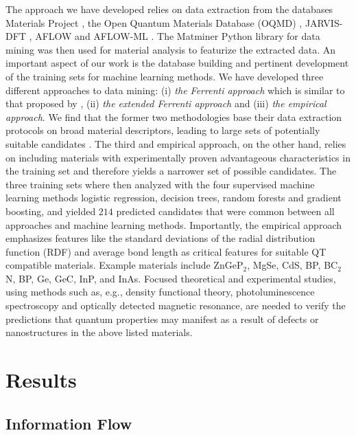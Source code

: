 \documentclass[superscriptaddress,unsortedaddress,
 amsmath,amssymb,
 aps,
]{revtex4-2}
\begin{document}
The approach we have developed relies on data extraction from the databases Materials Project \cite{Jain2013,Jain2018}, the Open Quantum Materials Database (OQMD) \cite{Saal2013, Kirklin2015}, JARVIS-DFT \cite{Choudhary2020}, AFLOW \cite{Curtarolo2012, Curtarolo2012a, Calderon2015} and AFLOW-ML \cite{Isayev2017}. 
The Matminer Python library for data mining \cite{Ward2018} was then used for material analysis to featurize the extracted data. An important aspect of our work is the database building and pertinent development of the training sets for machine learning methods. We have developed three different approaches to data mining: (i) \emph{the Ferrenti approach} which is similar to that proposed by \citeauthor{Ferrenti2020} \cite{Ferrenti2020}, (ii) 
\emph{the extended Ferrenti approach} and (iii) \emph{the empirical approach}. We find that the former two methodologies base their data extraction protocols on broad material descriptors, leading to large sets of potentially suitable candidates \cite{Mehta2019,Hastie2009}. The third and empirical approach, on the other hand, relies on including materials with experimentally proven advantageous characteristics in the training set and therefore yields a narrower set of possible candidates.  The three training sets where then analyzed with the four supervised machine learning methods logistic regression, decision trees, random forests and gradient boosting, and yielded $214$ predicted candidates that were common between all approaches and machine learning methods. Importantly, the empirical approach emphasizes features like the standard deviations  of  the  radial  distribution  function  (RDF) and average bond length as critical features for suitable QT compatible materials.
Example materials include ZnGeP$_2$, MgSe, CdS, BP, BC$_2$N, BP, Ge, GeC, InP, and InAs. 
Focused theoretical and experimental studies, using methods such as, e.g., density functional theory, photoluminescence spectroscopy and optically detected magnetic resonance, are needed to verify the predictions that quantum properties may manifest as a result of defects or nanostructures in the above listed materials. 

\section*{Results}

\subsection*{Information Flow} 
\end{document}
